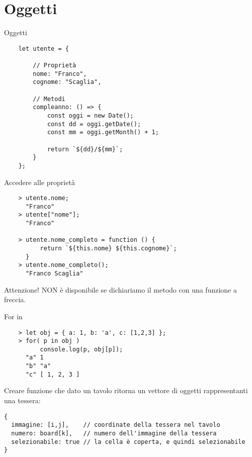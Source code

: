 \section{Oggetti}
\begin{frame}[fragile]{Oggetti}\transfade\centering
  \begin{verbatim}
    let utente = {

        // Proprietà
        nome: "Franco",
        cognome: "Scaglia",

        // Metodi
        compleanno: () => {
            const oggi = new Date();
            const dd = oggi.getDate();
            const mm = oggi.getMonth() + 1;

            return `${dd}/${mm}`;
        }
    };
  \end{verbatim}
\end{frame}

\begin{frame}[fragile]{Accedere alle proprietà}\transfade\centering
  \begin{verbatim}
    > utente.nome;
      "Franco"
    > utente["nome"];
      "Franco"

    > utente.nome_completo = function () {
          return `${this.nome} ${this.cognome}`;
      }
    > utente.nome_completo();
      "Franco Scaglia"
  \end{verbatim}
  \bigskip
  \alert{Attenzione!}  NON è disponibile se dichiariamo il metodo con una funzione a freccia.\\
\end{frame}

\begin{frame}[fragile]{For in}\transfade\centering
  \begin{verbatim}
    > let obj = { a: 1, b: 'a', c: [1,2,3] };
    > for( p in obj )
          console.log(p, obj[p]);
      "a" 1
      "b" "a"
      "c" [ 1, 2, 3 ]
  \end{verbatim}
\end{frame}



\begin{frame}[fragile]\transfade
  \begin{exercise}\centering
    Creare funzione  che dato un tavolo  ritorna un vettore di oggetti rappresentanti una tessera:
    \begin{verbatim}
{
  immagine: [i,j],    // coordinate della tessera nel tavolo
  numero: board[k],   // numero dell'immagine della tessera
  selezionabile: true // la cella è coperta, e quindi selezionabile
}
    \end{verbatim}
  \end{exercise}
\end{frame}

